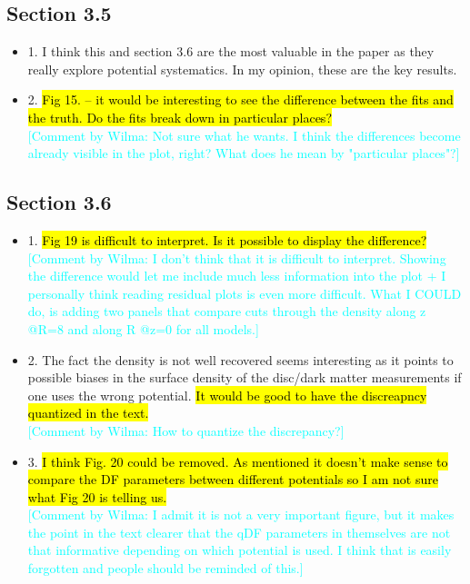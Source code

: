 \documentclass[10pt,a4paper]{article}
\newcommand{\HW}[1]{\textcolor{Cyan}{#1}}
\begin{document}
\subsection{Section 3.5}
\begin{itemize}
\item 1. I think this and section 3.6 are the most valuable in the paper as they really explore potential systematics. In my opinion, these are the key results.
\item 2. \hl{Fig 15. -- it would be interesting to see the difference between the fits and the truth. Do the fits break down in particular places?}\\\HW{[Comment by Wilma: Not sure what he wants. I think the differences become already visible in the plot, right? What does he mean by "particular places"?]}
\end{itemize}

\subsection{Section 3.6}
\begin{itemize}
\item 1. \hl{Fig 19 is difficult to interpret. Is it possible to display the difference?}\\\HW{[Comment by Wilma: I don't think that it is difficult to interpret. Showing the difference would let me include much less information into the plot + I personally think reading residual plots is even more difficult. What I COULD do, is adding two panels that compare cuts through the density along z @R=8 and along R @z=0 for all models.]}
\item 2. The fact the density is not well recovered seems interesting as it points to possible biases in the surface density of the disc/dark matter measurements if one uses the wrong potential. \hl{It would be good to have the discreapncy quantized in the text.}\\\HW{[Comment by Wilma: How to quantize the discrepancy?]}
\item 3. \hl{I think Fig. 20 could be removed. As mentioned it doesn't make sense to compare the DF parameters between different potentials so I am not sure what Fig 20 is telling us.}\\\HW{[Comment by Wilma: I admit it is not a very important figure, but it makes the point in the text clearer that the qDF parameters in themselves are not that informative depending on which potential is used. I think that is easily forgotten and people should be reminded of this.]}
\end{itemize}
\end{document}
